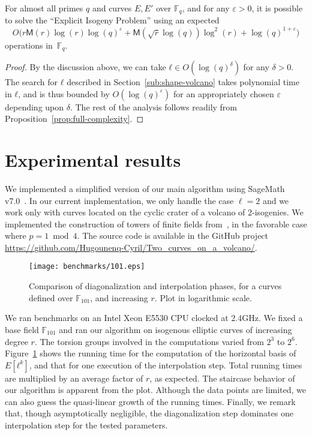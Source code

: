 \documentclass{lms}
\def\cout#1{\mathsf{#1}}
\newcommand{\F}{\mathbb{F}}
\newcommand{\MM}{\cout{M}}
\begin{document}
\begin{thm*}
  For almost all primes $q$ and curves $E,E'$ over $\F_q$, and for any
  $ε>0$, it is possible to solve the “Explicit Isogeny Problem” using
  an expected
  \[O\bigl(r\MM(r)\log(r)\log(q)^ε + \MM(\sqrt{r}\log(q))\log^2(r) +
    \log(q)^{1+ε}\bigr)\]
  operations in~$\F_q$.
\end{thm*}
\begin{proof}
  By the discussion above, we can take $ℓ∈O(\log(q)^δ)$ for any $δ>0$.
  The search for $ℓ$ described in Section~\ref{sub:shape-volcano}
  takes polynomial time in $ℓ$, and is thus bounded by $O(\log(q)^ε)$
  for an appropriately chosen $ε$ depending upon $δ$.  The rest of the
  analysis follows readily from
  Proposition~\ref{prop:full-complexity}.
\end{proof}


\section{Experimental results}
\label{sec:implem}


We implemented a simplified version of our main algorithm using
SageMath v7.0~\cite{sage}. In our current implementation, we only
handle the case $\ell=2$ and we work only with curves located on the
cyclic crater of a volcano of $2$-isogenies. We implemented the
construction of towers of finite fields from~\cite{DoSc12}, in the
favorable case where $p = 1 \bmod 4$. The source code is available in
the GitHub project
\url{https://github.com/Hugounenq-Cyril/Two_curves_on_a_volcano/}.

\begin{figure}\label{fig:p=101}
\centering
\texttt{[image: benchmarks/101.eps]}
\caption{Comparison of diagonalization and interpolation phases, for a
  curves defined over $\F_{101}$, and increasing $r$. Plot in logarithmic scale.}
\label{fig:p=101}
\end{figure}

We ran benchmarks on an Intel Xeon E5530 CPU clocked at 2.4GHz. We
fixed a base field $\F_{101}$ and ran our algorithm on isogenous
elliptic curves of increasing degree $r$. The torsion groups involved
in the computations varied from $2^3$ to $2^6$.
Figure~\ref{fig:p=101} shows the running time for the computation of
the horizontal basis of $E[ℓ^k]$, and that for one execution of the
interpolation step. Total running times are multiplied by an average
factor of $r$, as expected. The staircase behavior of our algorithm is
apparent from the plot. Although the data points are limited, we can
also guess the quasi-linear growth of the running times. Finally, we
remark that, though asymptotically negligible, the diagonalization
step dominates one interpolation step for the tested parameters.
\end{document}
